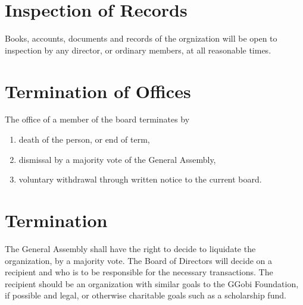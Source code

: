 \documentclass{article}
\begin{document}
\section{Inspection of Records}

Books, accounts, documents and records of the orgnization will be open
to inspection by any director, or ordinary members, at all reasonable
times.

\section{Termination of Offices}

The office of a member of the board terminates by

\begin{enumerate} \itemsep 0in
\item death of the person, or end of term,
\item dismissal by a majority vote of the General Assembly,
\item voluntary withdrawal through written notice to the current board.
\end{enumerate}

\section{Termination}

The General Assembly shall have the right to decide to liquidate the
organization, by a majority vote. The Board of Directors will decide
on a recipient and who is to be responsible for the necessary
transactions. The recipient should be an organization with similar
goals to the GGobi Foundation, if possible and legal, or otherwise
charitable goals such as a scholarship fund.
\end{document}
